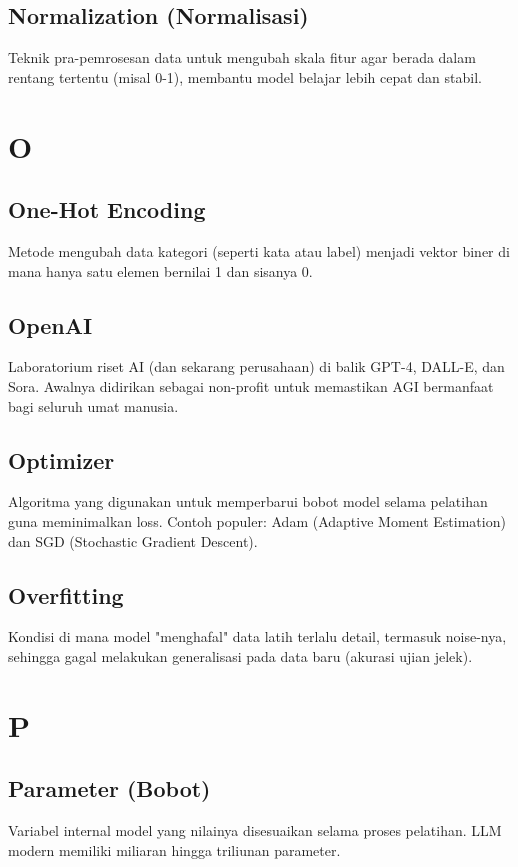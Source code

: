 \subsection*{Normalization (Normalisasi)}
Teknik pra-pemrosesan data untuk mengubah skala fitur agar berada dalam rentang tertentu (misal 0-1), membantu model belajar lebih cepat dan stabil.

\section*{O}

\subsection*{One-Hot Encoding}
Metode mengubah data kategori (seperti kata atau label) menjadi vektor biner di mana hanya satu elemen bernilai 1 dan sisanya 0.

\subsection*{OpenAI}
Laboratorium riset AI (dan sekarang perusahaan) di balik GPT-4, DALL-E, dan Sora. Awalnya didirikan sebagai non-profit untuk memastikan AGI bermanfaat bagi seluruh umat manusia.

\subsection*{Optimizer}
Algoritma yang digunakan untuk memperbarui bobot model selama pelatihan guna meminimalkan loss. Contoh populer: Adam (Adaptive Moment Estimation) dan SGD (Stochastic Gradient Descent).

\subsection*{Overfitting}
Kondisi di mana model "menghafal" data latih terlalu detail, termasuk noise-nya, sehingga gagal melakukan generalisasi pada data baru (akurasi ujian jelek).

\section*{P}

\subsection*{Parameter (Bobot)}
Variabel internal model yang nilainya disesuaikan selama proses pelatihan. LLM modern memiliki miliaran hingga triliunan parameter.

